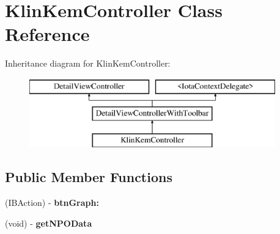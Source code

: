 \hypertarget{interface_klin_kem_controller}{
\section{KlinKemController Class Reference}
\label{interface_klin_kem_controller}
}
Inheritance diagram for KlinKemController:\begin{figure}[H]
\begin{center}
\leavevmode
\includegraphics[height=3.000000cm]{interface_klin_kem_controller}
\end{center}
\end{figure}
\subsection*{Public Member Functions}
\begin{DoxyCompactItemize}
\item 
\hypertarget{interface_klin_kem_controller_a5d18288d32e4b2ce2006e3fccd4ea41b}{
(IBAction) -\/ {\bfseries btnGraph:}}
\label{interface_klin_kem_controller_a5d18288d32e4b2ce2006e3fccd4ea41b}

\item 
\hypertarget{interface_klin_kem_controller_ad64ca8463bf7a27992c3aee568850c17}{
(void) -\/ {\bfseries getNPOData}}
\label{interface_klin_kem_controller_ad64ca8463bf7a27992c3aee568850c17}

\end{DoxyCompactItemize}
